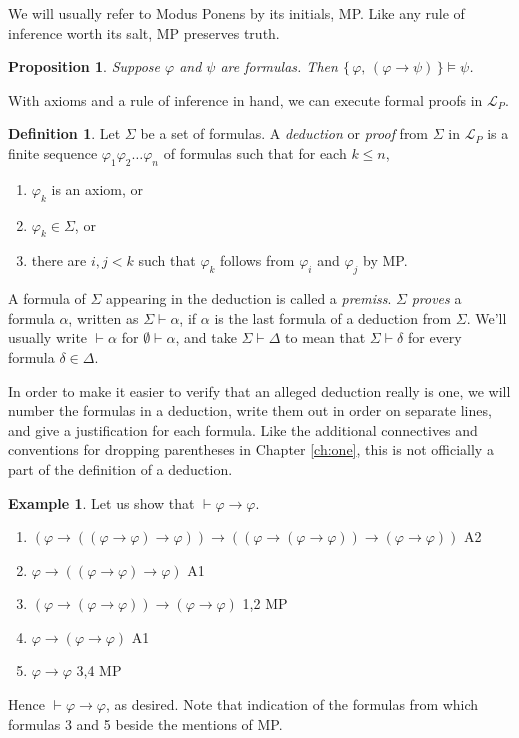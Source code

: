 \documentclass[12pt]{amsbook}
\newcommand{\proves}{\vdash}
\theoremstyle{plain}
\newtheorem{prop}[thm]{Proposition}
\theoremstyle{definition}
\newtheorem{defn}{Definition}[chapter]
\newtheorem{exmp}{Example}[chapter]
\theoremstyle{remark}
\begin{document}
We will usually refer to Modus Ponens by its initials,  MP.  Like any rule of inference worth its salt,  MP preserves truth.

\begin{prop} \label{p:snd}
Suppose $\varphi$ and $\psi$ are formulas.  Then $\{\, \varphi ,\, (\varphi \to \psi) \,\} \models \psi$.
\end{prop}

With axioms and a rule of inference in hand,  we can execute formal proofs in $\mathcal{L}_P$.

\begin{defn} \label{d:ded}  
Let $\Sigma$ be a set of formulas.  A {\em deduction\/} or {\em proof\/} from $\Sigma$ in $\mathcal{L}_P$ is a finite sequence $\varphi_1 \varphi_2 \dots \varphi_n$ of formulas such that for each $k \le n$,
\begin{enumerate}
\item $\varphi_k$ is an axiom,  or
\item $\varphi_k \in \Sigma$,  or
\item there are $i,j < k$ such that $\varphi_k$ follows from $\varphi_i$ and $\varphi_j$ by MP.
\end{enumerate}
A formula of $\Sigma$ appearing in the deduction is called a {\em premiss\/}.  $\Sigma$ {\em proves\/} a formula $\alpha$,  written as $\Sigma \proves \alpha$,\index{$\proves$}  if $\alpha$ is the last formula of a deduction from $\Sigma$.  We'll usually write $\proves \alpha$ for $\emptyset \proves \alpha$,  and take $\Sigma \proves \Delta$ to mean that $\Sigma \proves \delta$ for every formula $\delta \in \Delta$. 
\end{defn}

In order to make it easier to verify that an alleged deduction really is one,  we will number the formulas in a deduction,  write them out in order on separate lines,  and give a justification for each formula.  Like the additional connectives and conventions for dropping parentheses in Chapter \ref{ch:one},  this is not officially a part of the definition of a deduction.

\begin{exmp} \label{e:one}
Let us show that $\proves \varphi \to \varphi$.
\begin{enumerate}
\item $(\varphi \to ((\varphi \to \varphi) \to \varphi)) \to ((\varphi \to (\varphi \to \varphi)) \to (\varphi \to \varphi))$ \hfill A2
\item $\varphi \to ((\varphi \to \varphi) \to \varphi)$ \hfill A1
\item $(\varphi \to (\varphi \to \varphi)) \to (\varphi \to \varphi)$
\hfill 1,2 MP
\item $\varphi \to (\varphi \to \varphi)$ \hfill A1
\item $\varphi \to \varphi$ \hfill 3,4 MP
\end{enumerate}
Hence $\proves \varphi \to \varphi$,  as desired.  Note that indication of the formulas from which formulas 3 and 5 beside the mentions of MP.
\end{exmp}
\end{document}
